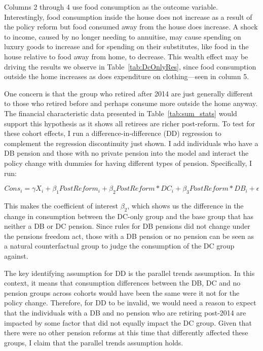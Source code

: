 \documentclass[12pt]{article}
\begin{document}
Columns 2 through 4 use food consumption as the outcome variable. Interestingly,
food consumption inside the house does not increase as a result of the policy
reform but food consumed away from the house does increase. A shock to income,
caused by no longer needing to annuitise, may cause spending on luxury goods to
increase and for spending on their substitutes, like food in the house relative
to food away from home, to decrease. This wealth effect may be driving the
results we observe in Table~\ref{tab:DcOnlyRes}, since food consumption outside the
home increases as does expenditure on clothing---seen in column 5.

One concern is that the group who retired after 2014 are just generally
different to those who retired before and perhaps consume more outside the home
anyway. The financial characteristic data presented in Table~\ref{tab:sum_stats}
would support this hypothesis as it shows all retirees are richer post-reform.
To test for these cohort effects, I run a difference-in-difference (DD)
regression to complement the regression discontinuity just shown. I add
individuals who have a DB pension and those with no private pension into the
model and interact the policy change with dummies for having different types of
pension. Specifically, I run:

\begin{equation*}
  Cons_{i} =  \gamma X_{i} + \beta_{1} PostReform_{i} + \beta_{2} PostReform*DC_{i} + \beta_{3} PostReform*DB_{i}  + \epsilon
\end{equation*}


This makes the coefficient of interest $\beta_{2}$, which shows us the
difference in the change in consumption between the DC-only group and the base
group that has neither a DB or DC pension. Since rules for DB pensions did not
change under the pensions freedom act, those with a DB pension or no pension can
be seen as a natural counterfactual group to judge the consumption of the DC
group against.

The key identifying assumption for DD is the parallel trends assumption. In this
context, it means that consumption differences between the DB, DC and no pension
groups across cohorts would have been the same were it not for the policy change.
Therefore, for DD to be invalid, we would need a reason to expect that the
individuals with a DB and no pension who are retiring post-2014 are impacted by
some factor that did not equally impact the DC group. Given that there were no
other pension reforms at this time that differently affected these groups, I
claim that the parallel trends assumption holds.
\end{document}
